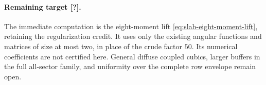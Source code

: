 \paragraph{Remaining target [?].}
The immediate computation is the eight-moment lift
\eqref{eq:slab-eight-moment-lift}, retaining the regularization credit.
It uses only the existing angular functions and matrices of size at
most two, in place of the crude factor \(50\).
Its numerical coefficients are not certified here. General diffuse
coupled cubics, larger buffers in the full all-sector family, and
uniformity over the complete row envelope remain open.
